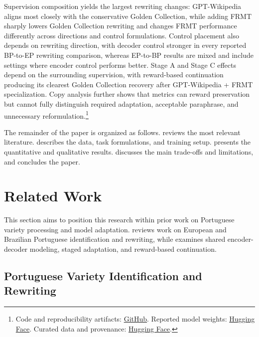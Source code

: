 \documentclass[acmtog,nonacm]{acmart}
\begin{document}
Supervision composition yields the largest rewriting changes: GPT-Wikipedia
aligns most closely with the conservative Golden Collection, while adding FRMT
sharply lowers Golden Collection rewriting and changes FRMT performance
differently across directions and control formulations. Control placement also depends on rewriting direction, with decoder control
stronger in every reported BP-to-EP rewriting comparison, whereas EP-to-BP
results are mixed and include settings where encoder control performs better. Stage A and Stage C effects
depend on the surrounding supervision, with reward-based continuation producing
its clearest Golden Collection recovery after GPT-Wikipedia + FRMT
specialization. Copy analysis further shows that metrics can reward preservation but cannot fully distinguish required adaptation, acceptable paraphrase, and unnecessary reformulation.\footnote{Code and
reproducibility artifacts: \href{https://github.com/laiarodrigo/Thesis}{GitHub}.
Reported model weights:
\href{https://huggingface.co/laiarodrigo/portuguese-variant-t5gemma2}{Hugging Face}.
Curated data and provenance:
\href{https://huggingface.co/datasets/laiarodrigo/portuguese-variant-data}{Hugging Face}.}

The remainder of the paper is organized as follows.  reviews the most relevant literature.  describes the data, task formulations, and training setup.  presents the quantitative and qualitative results.  discusses the main trade-offs and limitations, and  concludes the paper.

\section{Related Work}
\label{sec:related-work}

This section aims to position this research within prior work on Portuguese
variety processing and model adaptation. 
reviews work on European and Brazilian Portuguese identification and
rewriting, while  examines
shared encoder-decoder modeling, staged adaptation, and reward-based
continuation.

\subsection{Portuguese Variety Identification and Rewriting}
\label{sec:rw-portuguese-variety}
\end{document}

